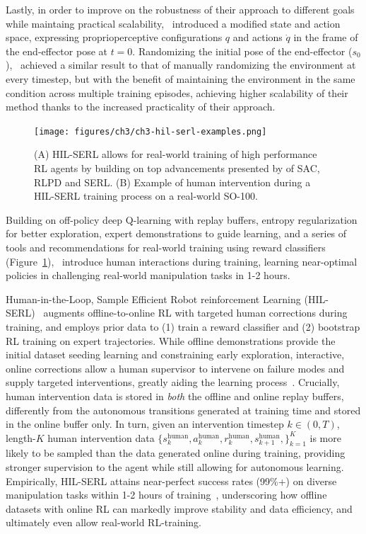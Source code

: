 Lastly, in order to improve on the robustness of their approach to different goals while maintaing practical scalability,~\citet{luoSERLSoftwareSuite2025} introduced a modified state and action space, expressing proprioperceptive configurations \( q \)  and actions \( \dot q \) in the frame of the end-effector pose at \( t=0 \).
Randomizing the initial pose of the end-effector (\( s_0 \)),~\citet{luoSERLSoftwareSuite2025} achieved a similar result to that of manually randomizing the environment at every timestep, but with the benefit of maintaining the environment in the same condition across multiple training episodes, achieving higher scalability of their method thanks to the increased practicality of their approach.

\begin{figure}
    \centering
    \texttt{[image: figures/ch3/ch3-hil-serl-examples.png]}
    \caption{(A) HIL-SERL allows for real-world training of high performance RL agents by building on top advancements presented by of SAC, RLPD and SERL. (B) Example of human intervention during a HIL-SERL training process on a real-world SO-100.}
    \label{fig:hil-serl-blocks}
\end{figure}

Building on off-policy deep Q-learning with replay buffers, entropy regularization for better exploration, expert demonstrations to guide learning, and a series of tools and recommendations for real-world training using reward classifiers (Figure~\ref{fig:hil-serl-blocks}),~\citet{luoPreciseDexterousRobotic2024} introduce human interactions during training, learning near-optimal policies in challenging real-world manipulation tasks in 1-2 hours.

Human-in-the-Loop, Sample Efficient Robot reinforcement Learning (HIL-SERL)~\citep{luoPreciseDexterousRobotic2024} augments offline-to-online RL with targeted human corrections during training, and employs prior data to (1) train a reward classifier and (2) bootstrap RL training on expert trajectories.
While offline demonstrations provide the initial dataset seeding learning and constraining early exploration, interactive, online corrections allow a human supervisor to intervene on failure modes and supply targeted interventions, greatly aiding the learning process~\citep{luoPreciseDexterousRobotic2024}.
Crucially, human intervention data is stored in \emph{both} the offline and online replay buffers, differently from the autonomous transitions generated at training time and stored in the online buffer only.
In turn, given an intervention timestep \( k \in (0, T) \), length-\(K\) human intervention data \( \{ s^{\text{human}}_k, a^{\text{human}}_k, r^{\text{human}}_k, s^{\text{human}}_{k+1},\}_{k=1}^K \) is more likely to be sampled than the data generated online during training, providing stronger supervision to the agent while still allowing for autonomous learning.
Empirically, HIL-SERL attains near-perfect success rates (99\%+) on diverse manipulation tasks within 1-2 hours of training~\citep{luoPreciseDexterousRobotic2024}, underscoring how offline datasets with online RL can markedly improve stability and data efficiency, and ultimately even allow real-world RL-training.

